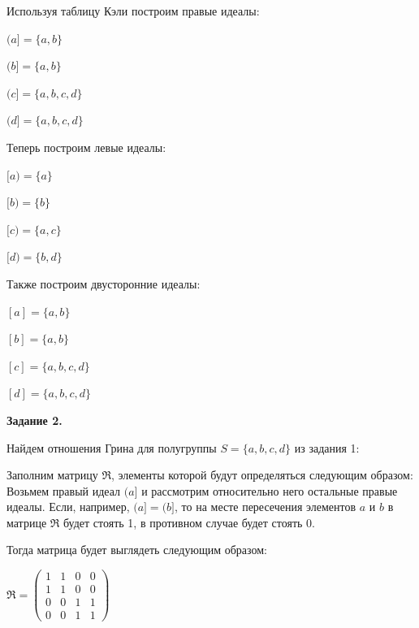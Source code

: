 \documentclass[bachelor, och, labwork]{shiza}
\begin{document}
\begin{enumerate}
      Используя таблицу Кэли построим правые идеалы:
      
      \begin{center}

        $(a] = \{a, b\}$

        $(b] = \{a, b\}$
  
        $(c] = \{a, b, c, d\}$
  
        $(d] = \{a, b, c, d\}$
    
      \end{center}
    
      
      Теперь построим левые идеалы:

      \begin{center}
      
        $[a) = \{a\}$

        $[b) = \{b\}$

        $[c) = \{a, c\}$

        $[d) = \{b, d\}$
      \end{center}

      Также построим двусторонние идеалы:

      \begin{center}
      
        $[a] = \{a, b\}$

        $[b] = \{a, b\}$

        $[c] = \{a, b, c, d\}$

        $[d] = \{a, b, c, d\}$
        
      \end{center}


    \end{enumerate}
    
    
    \textbf{Задание 2.}
    
    Найдем отношения Грина для полугруппы $S = \{a, b, c, d\}$ из задания 1:

    Заполним матрицу $\mathfrak{R}$, элементы которой будут определяться следующим образом: Возьмем правый идеал $(a]$ и рассмотрим относительно
    него остальные правые идеалы. Если, например, $(a] = (b]$, то на месте пересечения элементов $a$ и $b$ в матрице $\mathfrak{R}$ будет стоять 1,
    в противном случае будет стоять 0.

    Тогда матрица будет выглядеть следующим образом:

    \begin{center}
      $\mathfrak{R} =
      \begin{pmatrix}
        1 & 1 & 0 & 0 \\
        1 & 1 & 0 & 0 \\
        0 & 0 & 1 & 1 \\
        0 & 0 & 1 & 1
      \end{pmatrix}$
    \end{center}
    
\end{document}
